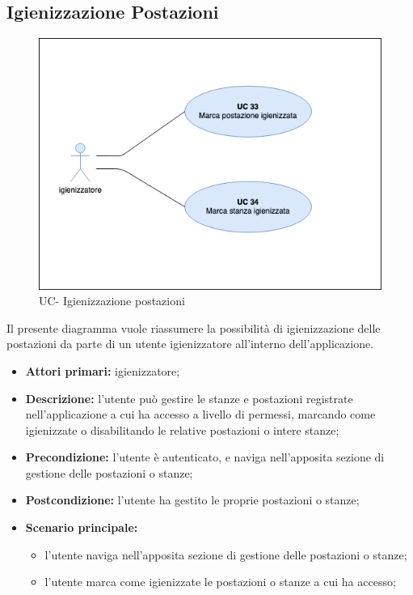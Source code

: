 \subsection{Igienizzazione Postazioni}

\begin{figure}[h]
  \centering
    \includegraphics[scale=0.5]{src/CasiDUso/immagini/UC-igienizzazionePostazioni.png}
  \caption{UC- Igienizzazione postazioni}
\end{figure}

Il presente diagramma vuole riassumere la possibilità di igienizzazione delle postazioni da parte di un utente igienizzatore all'interno dell’applicazione.

\begin{itemize}
\item \textbf{Attori primari:} igienizzatore;
\item \textbf{Descrizione:} l’utente può gestire le stanze e postazioni registrate nell’applicazione a cui ha accesso a livello di permessi, marcando come igienizzate o disabilitando le relative postazioni o intere stanze;
\item \textbf{Precondizione:} l'utente è autenticato, e naviga nell’apposita sezione di gestione delle postazioni o stanze;
\item \textbf{Postcondizione:} l’utente ha gestito le proprie postazioni o stanze;
\item \textbf{Scenario principale:} 
	\begin{itemize}
		\item l’utente naviga nell’apposita sezione di gestione delle postazioni o stanze;
		\item l’utente marca come igienizzate le postazioni o stanze a cui ha accesso;
	\end{itemize}
\end{itemize}

